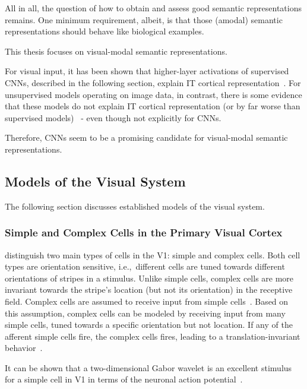 All in all, the question of how to obtain and assess good semantic representations remains.
One minimum requirement, albeit, is that those (amodal) semantic representations should behave like biological examples.

This thesis focuses on visual-modal semantic representations.

For visual input, it has been shown that higher-layer activations of supervised \acp{CNN}, described in the following section, explain \ac{IT} cortical representation~\citep{khaligh2014deep,cadieu2014deep}.
For unsupervised models operating on image data, in contrast, there is some evidence that these models do not explain \ac{IT} cortical representation (or by far worse than supervised models)~\citep{khaligh2014deep} - even though not explicitly for \acp{CNN}.

Therefore, \acp{CNN} seem to be a promising candidate for visual-modal semantic representations.

\subsection{Models of the Visual System}\label{subsec:models-of-the-visual-system}

The following section discusses established models of the visual system.

\subsubsection{Simple and Complex Cells in the Primary Visual Cortex}\label{subsubseq:simple_complex_cells}

\citet{hubel1962receptive} distinguish two main types of cells in the \ac{V1}: simple and complex cells.
Both cell types are orientation sensitive, i.e.,~different cells are tuned towards different orientations of stripes in a stimulus.
Unlike simple cells, complex cells are more invariant towards the stripe's location (but not its orientation) in the receptive field.
Complex cells are assumed to receive input from simple cells~\citep{hubel1962receptive}.
Based on this assumption, complex cells can be modeled by receiving input from many simple cells, tuned towards a specific orientation but not location.
If any of the afferent simple cells fire, the complex cells fires, leading to a translation-invariant behavior~\citep{hubel1962receptive}.

It can be shown that a two-dimensional Gabor wavelet is an excellent stimulus for a simple cell in \ac{V1} in terms of the neuronal action potential~\citep{jones1987evaluation}.

